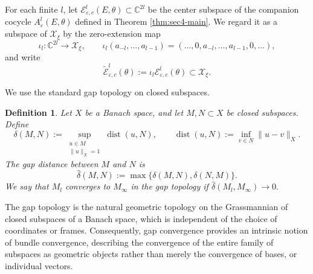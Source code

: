 \documentclass[reqno,11pt]{amsart}
\newtheorem{definition}{Definition}[section]
\begin{document}
For each finite $l$, let
$
\mathcal E_{\varepsilon,c}^l(E,\theta)\subset \mathbb C^{2l}
$
be the center subspace of the companion cocycle
$A_\varepsilon^l(E,\theta)$ defined in Theorem \ref{thm:sec4-main}. We regard it as a subspace of $\mathcal X_\xi$ by
the zero-extension map
$$
\iota_l:\mathbb C^{2l}\rightarrow \mathcal X_\xi,
\qquad
\iota_l(a_{-l},\ldots,a_{l-1})=(\ldots,0,a_{-l},\ldots,a_{l-1},0,\ldots),
$$
and write
$$
\widetilde{\mathcal E}_{\varepsilon,c}^l(\theta):=
\iota_l\mathcal E_{\varepsilon,c}^l(\theta)
\subset \mathcal X_\xi .
$$

We use the standard gap topology on closed subspaces. 
\begin{definition}\cite{kato}
Let $X$ be a Banach space, and let $M,N\subset X$ be closed subspaces. Define
$$
\delta(M,N):=\sup_{\substack{u\in M\\ \|u\|_X=1}}
\operatorname{dist}(u,N),\qquad\operatorname{dist}(u,N):=\inf_{v\in N}\|u-v\|_X .
$$
The gap distance between $M$ and $N$ is
$$
\widehat\delta(M,N):=\max\{\delta(M,N),\delta(N,M)\}.
$$
We say that $M_l$ converges to $M_\infty$ in the gap topology if
$\widehat\delta(M_l,M_\infty)\to 0 .
$
\end{definition}

The gap topology is the natural geometric topology on the Grassmannian of closed subspaces of a Banach space, which is independent of the choice of coordinates or frames. Consequently, gap convergence provides an intrinsic notion of bundle convergence, describing the convergence of the entire family of subspaces as geometric objects rather than merely the convergence of  bases, or individual vectors.
\end{document}
